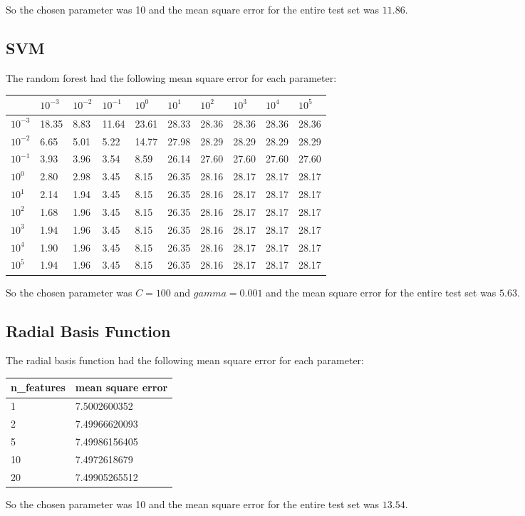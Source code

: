 \documentclass{article}
\begin{document}
So the chosen parameter was 10 and the mean square error for the entire test set was $11.86$.

\subsection{SVM}
The random forest had the following mean square error for each parameter:

\begin{table}[h]
\begin{tabular}{|l|l|l|l|l|l|l|l|l|l|}
\hline
 & $10^{-3}$ & $10^{-2}$ & $10^{-1}$ & $10^{0}$ & $10^{1}$ & $10^{2}$ & $10^{3}$ & $10^{4}$ & $10^{5}$ \\ \hline
 $10^{-3}$ & 18.35 & 8.83 & 11.64 & 23.61 & 28.33 & 28.36 & 28.36 & 28.36 & 28.36  \\ \hline
 $10^{-2}$ & 6.65 & 5.01 & 5.22 & 14.77 & 27.98 & 28.29 & 28.29 & 28.29 & 28.29  \\ \hline
 $10^{-1}$ & 3.93 & 3.96 & 3.54 & 8.59 & 26.14 & 27.60 & 27.60 & 27.60 & 27.60  \\ \hline
 $10^{0}$  & 2.80 & 2.98 & 3.45 & 8.15 & 26.35 & 28.16 & 28.17 & 28.17 & 28.17  \\ \hline
 $10^{1}$  & 2.14 & 1.94 & 3.45 & 8.15 & 26.35 & 28.16 & 28.17 & 28.17 & 28.17  \\ \hline
 $10^{2}$  & 1.68 & 1.96 & 3.45 & 8.15 & 26.35 & 28.16 & 28.17 & 28.17 & 28.17  \\ \hline
 $10^{3}$  & 1.94 & 1.96 & 3.45 & 8.15 & 26.35 & 28.16 & 28.17 & 28.17 & 28.17  \\ \hline
 $10^{4}$  & 1.90 & 1.96 & 3.45 & 8.15 & 26.35 & 28.16 & 28.17 & 28.17 & 28.17  \\ \hline
 $10^{5}$  & 1.94 & 1.96 & 3.45 & 8.15 & 26.35 & 28.16 & 28.17 & 28.17 & 28.17  \\ \hline
\end{tabular}
\end{table}

So the chosen parameter was $C=100$ and $gamma=0.001$ and the mean square error for the entire test set was $5.63$.

\subsection{Radial Basis Function}
The radial basis function had the following mean square error for each parameter:

\begin{table}[h]
\begin{tabular}{|l|l|}
\hline
\textbf{n\_features} & \textbf{mean square error} \\ \hline
 1 & 7.5002600352 \\ \hline
 2 & 7.49966620093 \\ \hline
 5 & 7.49986156405 \\ \hline
10 & 7.4972618679 \\ \hline
20 & 7.49905265512 \\ \hline
\end{tabular}
\end{table}

So the chosen parameter was 10 and the mean square error for the entire test set was $13.54$.
\end{document}
